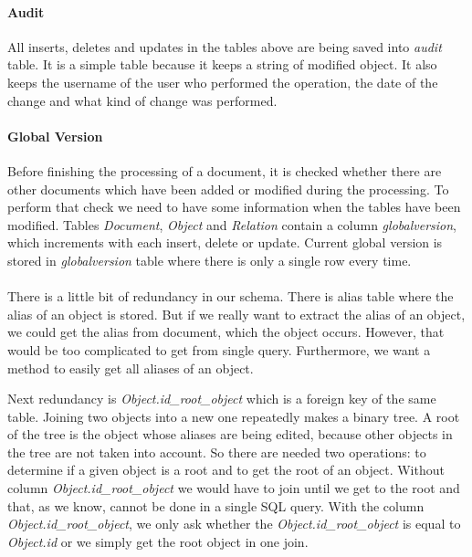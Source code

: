 \paragraph{Audit} All inserts, deletes and updates in the tables above are being
saved into \emph{audit} table. It is a simple table because it keeps a string of
modified object. It also keeps the username of the user who performed the
operation, the date of the change and what kind of change was performed.
 
\paragraph{Global Version} Before finishing the processing of a document, it is
checked whether there are other documents which have been added or modified
during the processing. To perform that check we need to have some information
when the tables have been modified. Tables \emph{Document}, \emph{Object} and
\emph{Relation} contain a column \emph{globalversion}, which increments with
each insert, delete or update. Current global version is stored in
\emph{globalversion} table where there is only a single row every time.

\paragraph{} There is a little bit of redundancy in our schema.
There is alias table where the alias of an object is stored. But if we really
want to extract the alias of an object, we could get the alias from document,
which the object occurs. However, that would be too complicated to get from
single query. Furthermore, we want a method to easily get all aliases of an
object.

Next redundancy is \emph{Object.id\_{}root\_{}object} which is a foreign key of
the same table. Joining two objects into a new one repeatedly
makes a binary tree. A root of the tree is the object whose aliases are being
edited, because other objects in the tree are not taken into account. So there are needed two operations: to determine if a given object is a root and to get the
root of an object. Without column \emph{Object.id\_{}root\_{}object} we would have to
join until we get to the root and that, as we know, cannot be done in a single
SQL query. With the column \emph{Object.id\_{}root\_{}object}, we only ask whether the \emph{Object.id\_{}root\_{}object} is equal to \emph{Object.id} or we simply get the root object in one join.

